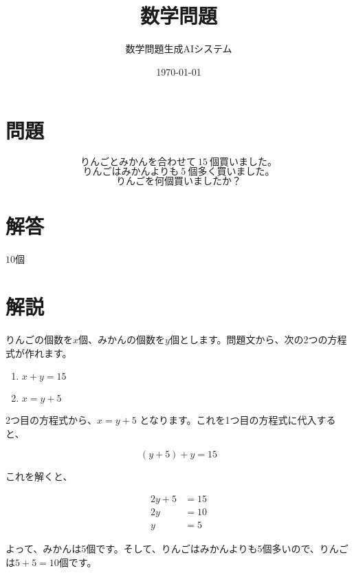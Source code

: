 \documentclass[a4paper,11pt]{article}
\title{数学問題}
\author{数学問題生成AIシステム}
\date{\today}
\numberwithin{equation}{section}
\theoremstyle{definition}
\theoremstyle{remark}
\begin{document}
\maketitle

\section*{問題}

\[
\text{りんごとみかんを合わせて} \: 15 \: \text{個買いました。}
\]
\[
\text{りんごはみかんよりも} \: 5 \: \text{個多く買いました。}
\]
\[
\text{りんごを何個買いましたか？}
\]



\section*{解答}

$10$個

\section*{解説}

りんごの個数を$x$個、みかんの個数を$y$個とします。問題文から、次の2つの方程式が作れます。

\begin{enumerate}
    \item $x + y = 15$
    \item $x = y + 5$
\end{enumerate}

2つ目の方程式から、$x = y + 5$ となります。これを1つ目の方程式に代入すると、

\[
(y + 5) + y = 15
\]

これを解くと、

\begin{align*}
2y + 5 &= 15 \\
2y &= 10 \\
y &= 5
\end{align*}

よって、みかんは5個です。そして、りんごはみかんよりも5個多いので、りんごは$5 + 5 = 10$個です。
\end{document}
